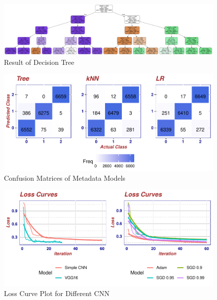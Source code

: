 \documentclass[
  11pt,
]{article}
\begin{document}
\begin{figure}
\centering
\begin{minipage}{\textwidth}
\centering
\includegraphics[width=\linewidth]{./images/decision_tree.png}
\caption{Result of Decision Tree}
\label{fig:res_dt}
\end{minipage}
\end{figure}

\begin{figure}
\centering
\includegraphics{final_report_files/figure-latex/cm-metadata-1.pdf}
\caption{\label{fig:cm-metadata}Confusion Matrices of Metadata Models}
\end{figure}

\begin{figure}
\centering
\includegraphics{final_report_files/figure-latex/loss-cnns-1.pdf}
\caption{\label{fig:loss-cnns}Loss Curve Plot for Different CNN}
\end{figure}
\end{document}
